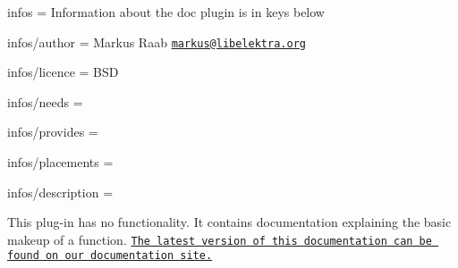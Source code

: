 
\begin{DoxyItemize}
\item infos = Information about the doc plugin is in keys below
\item infos/author = Markus Raab \href{mailto:markus@libelektra.org}{\tt markus@libelektra.\+org}
\item infos/licence = B\+S\+D
\item infos/needs =
\item infos/provides =
\item infos/placements =
\item infos/description =
\end{DoxyItemize}

This plug-\/in has no functionality. It contains documentation explaining the basic makeup of a function. \href{http://doc.libelektra.org/api/latest/html/group__plugin.html}{\tt The latest version of this documentation can be found on our documentation site.} 